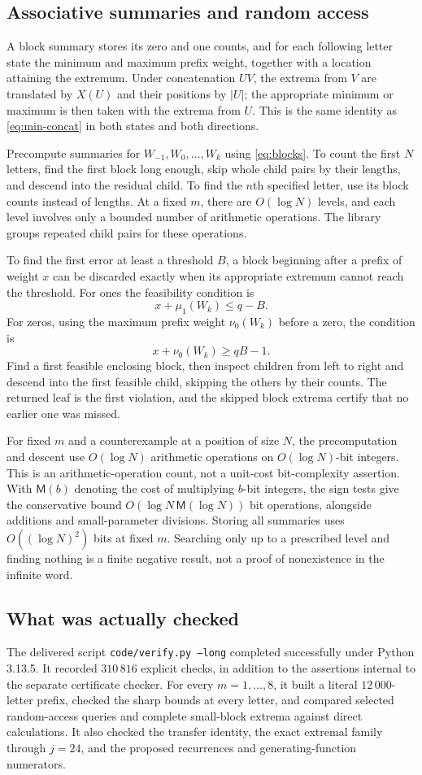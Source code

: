 \documentclass[11pt]{article}
\numberwithin{equation}{section}
\theoremstyle{definition}
\theoremstyle{remark}
\begin{document}
\subsection{Associative summaries and random access}
A block summary stores its zero and one counts, and for each following
letter state the minimum and maximum prefix weight, together with a
location attaining the extremum. Under concatenation $UV$, the extrema
from $V$ are translated by $X(U)$ and their positions by $|U|$; the
appropriate minimum or maximum is then taken with the extrema from $U$.
This is the same identity as \eqref{eq:min-concat} in both states and
both directions.

Precompute summaries for $W_{-1},W_0,\ldots,W_k$ using
\eqref{eq:blocks}. To count the first $N$ letters, find the first block
long enough, skip whole child pairs by their lengths, and descend into
the residual child. To find the $n$th specified letter, use its block
counts instead of lengths. At a fixed $m$, there are $O(\log N)$ levels,
and each level involves only a bounded number of arithmetic operations.
The library groups repeated child pairs for these operations.

To find the first error at least a threshold $B$, a block beginning after
a prefix of weight $x$ can be discarded exactly when its appropriate
extremum cannot reach the threshold. For ones the feasibility condition is
\[
x+\mu_1(W_k)\le q-B.
\]
For zeros, using the maximum prefix weight $\nu_0(W_k)$ before a zero,
the condition is
\[
x+\nu_0(W_k)\ge qB-1.
\]
Find a first feasible enclosing block, then inspect children from left to
right and descend into the first feasible child, skipping the others by
their counts. The returned leaf is the first violation, and the skipped
block extrema certify that no earlier one was missed.

For fixed $m$ and a counterexample at a position of size $N$, the
precomputation and descent use $O(\log N)$ arithmetic operations on
$O(\log N)$-bit integers. This is an arithmetic-operation count, not a
unit-cost bit-complexity assertion. With $\mathsf M(b)$ denoting the cost
of multiplying $b$-bit integers, the sign tests give the conservative
bound $O(\log N\,\mathsf M(\log N))$ bit operations, alongside additions
and small-parameter divisions. Storing all summaries uses
$O((\log N)^2)$ bits at fixed $m$. Searching only up to a prescribed
level and finding nothing is a finite negative result, not a proof of
nonexistence in the infinite word.

\subsection{What was actually checked}
The delivered script \texttt{code/verify.py --long} completed successfully
under Python 3.13.5. It recorded $310\,816$ explicit checks, in addition
to the assertions internal to the separate certificate checker.
For every $m=1,\ldots,8$, it built a literal $12\,000$-letter prefix,
checked the sharp bounds at every letter, and compared selected random-access
queries and complete small-block extrema against direct calculations.
It also checked the transfer identity, the exact extremal family through
$j=24$, and the proposed recurrences and generating-function numerators.
\end{document}
